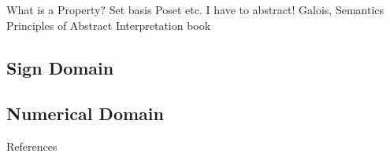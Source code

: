 \documentclass[
   aspectratio=169, %
   10pt, %
   nosectionframes,
   uniqueslidenumber,
   professionalfonts
]{beamer}
\begin{document}
\begin{frame}
   What is a Property? Set basis Poset etc. 
   I have to abstract! 
   Galois, Semantics Principles of Abstract Interpretation book
\end{frame}

\subsection{Sign Domain}

\begin{frame}
   
\end{frame}

\subsection{Numerical Domain}

\begin{frame}
   
\end{frame}

\begin{frame}[allowframebreaks]{References}
   \printbibliography
\end{frame}
\end{document}
